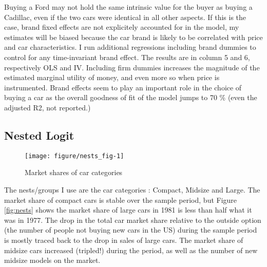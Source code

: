 \documentclass{article}\usepackage[]{graphicx}\usepackage[]{color}
\makeatletter
\def\maxwidth{ %
  \ifdim\Gin@nat@width>\linewidth
    \linewidth
  \else
    \Gin@nat@width
  \fi
}
\newenvironment{knitrout}{}{} %
\makeatother
\begin{document}
Buying a Ford may not hold the same intrinsic value for the buyer as buying a Cadillac, even if the two cars were identical in all other aspects. If this is the case, brand fixed effects are not explicitely accounted for in the model,  my estimates will be biased because the car brand is likely to be correlated with price and car characteristics. I run additional regressions including brand dummies to control for any time-invariant brand effect.  The results are in column 5 and 6, respectively OLS and IV. Including firm dummies increases the magnitude of the estimated marginal utility of money, and even more so when price is instrumented. Brand effects seem to play an important role in the choice of buying a car as the overall goodness of fit of the model jumps to 70 \% (even the adjusted R2, not reported.)
%


\subsection{Nested Logit}

%
\begin{knitrout}
\color{fgcolor}\begin{figure}[t]
\texttt{[image: figure/nests\_fig-1]} \caption[Market shares of car categories]{Market shares of car categories}\label{fig:nestsnests_fig}
\end{figure}


\end{knitrout}
%

The nests/groups I use are the car categories : Compact, Midsize and Large. The market share of compact cars is stable over the sample period, but Figure \ref{fig:nests} shows the market share of large cars in 1981 is less than half what it was in 1977. The drop in the total car market share relative to the outside option (the number of people not buying new cars in the US) during the sample period is mostly traced back to the drop in sales of large cars. The market share of midsize cars increased (tripled!) during the period, as well as the number of new midsize models on the market. 



%

%
\end{document}
